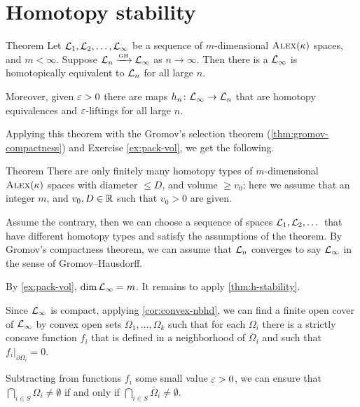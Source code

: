

\section{Homotopy stability}

\begin{thm}{Theorem}\label{thm:h-stability}
Let $\mathcal{L}_1,\mathcal{L}_2,\dots,\mathcal{L}_\infty$ be a sequence of $m$-dimensional $\textsc{Alex}(\kappa)$ spaces, and $m<\infty$.
Suppose $\spc{L}_n\z\GHto \spc{L}_\infty$ as $n\to \infty$.
Then there is a $\mathcal{L}_\infty$ is homotopically equivalent to $\mathcal{L}_n$ for all large $n$.

Moreover, given $\varepsilon>0$ there are maps $h_n\colon\mathcal{L}_\infty\to \mathcal{L}_n$ that are homotopy equivalences and $\varepsilon$-liftings for all large $n$.
\end{thm}

Applying this theorem with the Gromov's selection theorem (\ref{thm:gromov-compactness}) and Exercise \ref{ex:pack-vol}, we get the following.


\begin{thm}{Theorem}\label{thm:h-finiteness}
There are only finitely many homotopy types of $m$-dimensional $\textsc{Alex}(\kappa)$ spaces with diameter $\le D$, and volume $\ge v_0$;
here we assume that an integer $m$, and $v_0,D\in\mathbb{R}$ such that $v_0>0$ are given.
\end{thm}

Assume the contrary, then we can choose a sequence of spaces $\mathcal{L}_1,\mathcal{L}_2,\dots$ that have different homotopy types and satisfy the assumptions of the theorem.
By Gromov's compactness theorem, we can assume that $\mathcal{L}_n$ converges to say $\mathcal{L}_\infty$ in the sense of Gromov--Hausdorff.

By \ref{ex:pack-vol}, $\operatorname{\rm dim}\nolimits \mathcal{L}_\infty=m$.
It remains to apply \ref{thm:h-stability}.
\qeds

Since $\mathcal{L}_\infty$ is compact, applying \ref{cor:convex-nbhd}, we can find a finite open cover of $\mathcal{L}_\infty$ by convex open sets $\Omega_1,\dots, \Omega_k$ such that 
for each $\Omega_i$ there is a strictly concave function $f_i$ that is defined in a neighborhood of $\bar \Omega_i$ and such that $f_i|_{\partial \Omega_i}=0$.

Subtracting from functions $f_i$ some small value $\varepsilon>0$,
we can ensure that $\bigcap_{i\in S}\Omega_{i}\ne \emptyset$ if and only if $\bigcap_{i\in S}\bar\Omega_{i}\ne \emptyset$.

